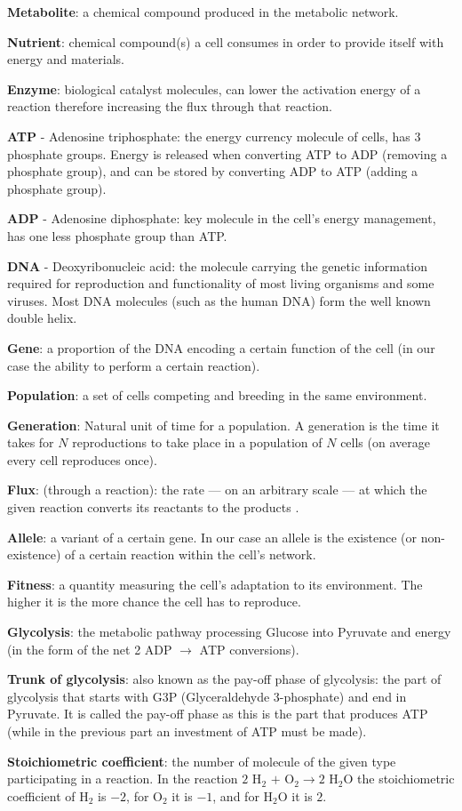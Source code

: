 \documentclass[a4paper,12pt]{article}
\begin{document}
	\begin{framed}

		\textbf{Metabolite}: a chemical compound produced in the metabolic network. 

		\textbf{Nutrient}: chemical compound(s) a cell consumes in order to provide itself with energy and materials.

		\textbf{Enzyme}: biological catalyst molecules, can lower the activation energy of a reaction therefore increasing the flux through that reaction. 

	\textbf{ATP} - Adenosine triphosphate: the energy currency molecule of cells, has 3 phosphate groups. Energy is released when converting ATP to ADP (removing a phosphate group), and can be stored by converting ADP to ATP (adding a phosphate group).

	\textbf{ADP} - Adenosine diphosphate: key molecule in the cell's energy management, has one less phosphate group than ATP.

	\textbf{DNA} - Deoxyribonucleic acid: the molecule carrying the genetic information required for reproduction and functionality of most living organisms and some viruses. Most DNA molecules (such as the human DNA) form the well known double helix. 

	\textbf{Gene}: a proportion of the DNA encoding a certain function of the cell (in our case the ability to perform a certain reaction). 

	\textbf{Population}: a set of cells competing and breeding in the same environment.

	\textbf{Generation}: Natural unit of time for a population. A generation is the time it takes for $N$ reproductions to take place in a population of $N$ cells (on average every cell reproduces once).

	\textbf{Flux}: (through a reaction): the rate ---  on an arbitrary scale --- at which the given reaction converts its reactants to the products . 

	\textbf{Allele}: a variant of a certain gene. In our case an allele is the existence (or non-existence) of a certain reaction within the cell's network.

	\textbf{Fitness}: a quantity measuring the cell's adaptation to its environment. The higher it is the more chance the cell has to reproduce.

	\textbf{Glycolysis}: the metabolic pathway processing Glucose into Pyruvate and energy (in the form of the net 2 ADP $\rightarrow$ ATP conversions).

	\textbf{Trunk of glycolysis}: also known as the pay-off phase of glycolysis: the part of glycolysis that starts with G3P (Glyceraldehyde 3-phosphate) and end in Pyruvate. It is called the pay-off phase as this is the part that produces ATP (while in the previous part an investment of ATP must be made).
	
	\textbf{Stoichiometric coefficient}: the number of molecule of the given type participating in a reaction. In the reaction $2$ H$_2$ $+$ O$_2 \rightarrow 2$ H$_2$O the stoichiometric coefficient of H$_2$ is $-2$, for O$_2$ it is $-1$, and for H$_2$O it is $2$. 

	\end{framed}
\end{document}
